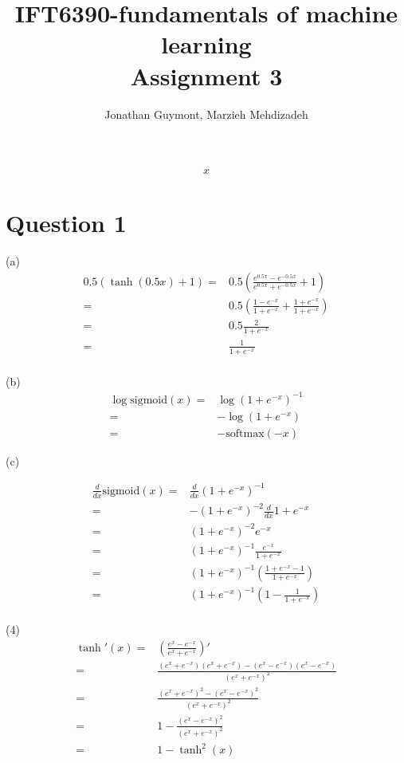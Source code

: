 \documentclass[11pt,english]{article}
\title{IFT6390-fundamentals of machine learning\\Assignment 3}
\author{Jonathan Guymont, Marzieh Mehdizadeh}
\date{}
\newcommand{\sigmoid}{\mathrm{sigmoid}}
\newcommand{\softmax}{\mathrm{softmax}}
\begin{document}
\maketitle

\begin{equation}
\begin{split}
x
\end{split}
\end{equation}

\section*{Question 1}
(a) 
\begin{equation}
\begin{split}
0.5(\tanh(0.5x)+1) =& 0.5 (\frac{e^{0.5x}-e^{-0.5x}}{e^{0.5x}+e^{-0.5x}}+1)\\
=& 0.5 (\frac{1-e^{-x}}{1+e^{-x}}+\frac{1+e^{-x}}{1+e^{-x}})\\
=& 0.5\frac{2}{1+e^{-x}}\\
=& \frac{1}{1+e^{-x}}\\
\end{split}
\end{equation}

(b) 
\begin{equation}
\begin{split}
\log \sigmoid(x)=& \log (1+e^{-x})^{-1}\\
=& - \log (1+e^{-x})\\
=& -\softmax(-x)
\end{split}
\end{equation}

(c)

\begin{equation}
\begin{split}
\frac{d}{dx}\sigmoid(x) =& \frac{d}{dx} (1+e^{-x})^{-1}\\
=& -(1+e^{-x})^{-2}\frac{d}{dx} 1+e^{-x} \\
=& (1+e^{-x})^{-2}e^{-x}\\
=& (1+e^{-x})^{-1}\frac{e^{-x}}{1+e^{-x}}\\
=& (1+e^{-x})^{-1}(\frac{1+e^{-x}-1}{1+e^{-x}})\\
=& (1+e^{-x})^{-1}(1- \frac{1}{1+e^{-x}})\\
\end{split}
\end{equation}

(4) 
\begin{equation}
\begin{split}
\tanh'(x)=& (\frac{e^x-e^{-x}}{e^x+e^{-x}})'\\
=& \frac{(e^x+e^{-x})(e^x+e^{-x})-(e^x-e^{-x})(e^x-e^{-x})}{(e^x+e^{-x})^2}\\
=& \frac{(e^x+e^{-x})^2-(e^x-e^{-x})^2}{(e^x+e^{-x})^2}\\
=& 1- \frac{(e^x-e^{-x})^2}{(e^x+e^{-x})^2}\\
=& 1 - \tanh^2(x)
\end{split}
\end{equation}
\end{document}
